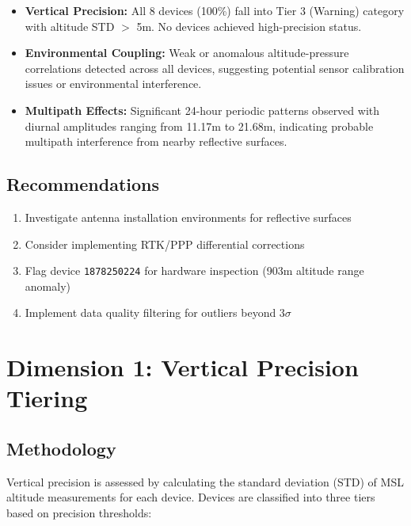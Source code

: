 \documentclass[11pt,a4paper]{article}
\begin{document}
\begin{itemize}[leftmargin=*]
    \item \textbf{Vertical Precision:} All 8 devices (100\%) fall into Tier 3 (Warning) category with altitude STD $>$ 5m. No devices achieved high-precision status.

    \item \textbf{Environmental Coupling:} Weak or anomalous altitude-pressure correlations detected across all devices, suggesting potential sensor calibration issues or environmental interference.

    \item \textbf{Multipath Effects:} Significant 24-hour periodic patterns observed with diurnal amplitudes ranging from 11.17m to 21.68m, indicating probable multipath interference from nearby reflective surfaces.
\end{itemize}

\subsection{Recommendations}

\begin{enumerate}
    \item Investigate antenna installation environments for reflective surfaces
    \item Consider implementing RTK/PPP differential corrections
    \item Flag device \texttt{1878250224} for hardware inspection (903m altitude range anomaly)
    \item Implement data quality filtering for outliers beyond 3$\sigma$
\end{enumerate}

\newpage

\section{Dimension 1: Vertical Precision Tiering}

\subsection{Methodology}

Vertical precision is assessed by calculating the standard deviation (STD) of MSL altitude measurements for each device. Devices are classified into three tiers based on precision thresholds:
\end{document}
